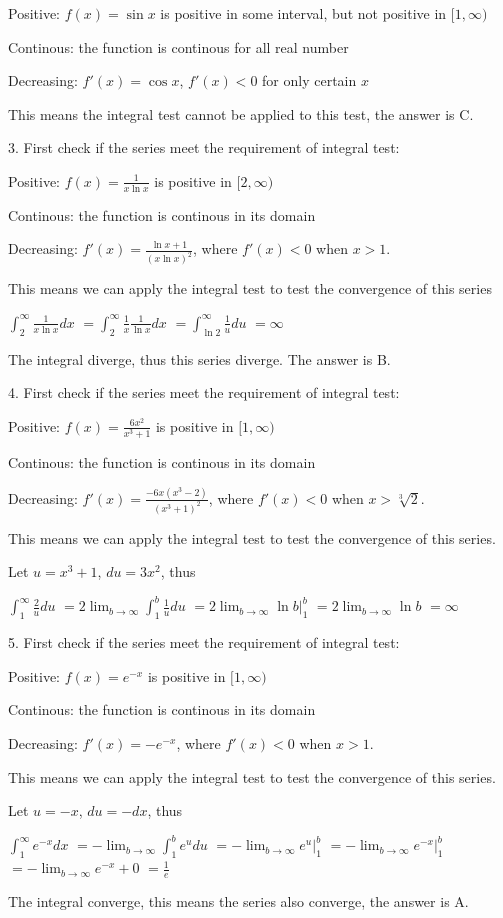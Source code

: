 \documentclass{article}
\numberwithin{equation}{section}
\begin{document}
Positive: $\displaystyle f(x) = \sin x$ is positive in some interval, but not positive in $[1,\infty)$

Continous: the function is continous for all real number 

Decreasing: $\displaystyle f'(x) = \cos x$, $f'(x) < 0$ for only certain $x$

This means the integral test cannot be applied to this test, the answer is C.

3. First check if the series meet the requirement of integral test:

Positive: $\displaystyle f(x) = \frac{1}{x\ln x}$ is positive in $[2,\infty)$

Continous: the function is continous in its domain

Decreasing: $\displaystyle f'(x) = \frac{\ln x +1}{(x\ln x)^2}$, where $f'(x) < 0$ when $x>1$.

This means we can apply the integral test to test the convergence of this series

$\displaystyle \int_{2}^{\infty} \frac{1}{x\ln x}dx$
$=\displaystyle \int_{2}^{\infty} \frac{1}{x} \frac{1}{\ln x}dx$
$=\displaystyle \int_{\ln 2}^{\infty} \frac{1}{u} du$
$=\displaystyle \infty$

The integral diverge, thus this series diverge. The answer is B.

4. First check if the series meet the requirement of integral test:

Positive: $\displaystyle f(x) = \frac{6x^2}{x^3+1}$ is positive in $[1,\infty)$

Continous: the function is continous in its domain

Decreasing: $\displaystyle f'(x) = \frac{-6x(x^3-2)}{(x^3+1)^2}$, where $f'(x) < 0$ when $x>\sqrt[3]{2}$.

This means we can apply the integral test to test the convergence of this series.

Let $u = x^3+1$, $du = 3x^2$, thus 

$\displaystyle \int_{1}^{\infty} \frac{2}{u}du$ 
$\displaystyle = 2\lim_{b\to \infty}\int_{1}^{b} \frac{1}{u}du$
$\displaystyle = 2\lim_{b\to \infty} \ln b \Big|_1^b$
$\displaystyle = 2 \lim_{b\to \infty} \ln b$
$\displaystyle = \infty$

5. First check if the series meet the requirement of integral test:

Positive: $\displaystyle f(x) = e^{-x}$ is positive in $[1,\infty)$

Continous: the function is continous in its domain

Decreasing: $\displaystyle f'(x) = -e^{-x}$, where $f'(x) < 0$ when $x>1$.

This means we can apply the integral test to test the convergence of this series.

Let $u = -x$, $du = -dx$, thus 

$\displaystyle \int_{1}^{\infty} e^{-x} dx$ 
$\displaystyle = -\lim_{b\to \infty}\int_{1}^{b} e^{u}du$
$\displaystyle = -\lim_{b\to \infty} e^u \Big|_1^b$
$\displaystyle = -\lim_{b\to \infty} e^{-x} \Big|_1^b$
$\displaystyle = -\lim_{b\to \infty} e^{-x} + 0$
$\displaystyle = \frac{1}{e}$

The integral converge, this means the series also converge, the answer is A.
\end{document}
